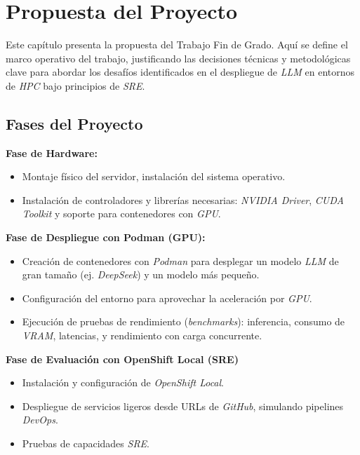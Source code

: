 \chapter{Propuesta del Proyecto}

Este capítulo presenta la propuesta del Trabajo Fin de Grado. Aquí se define el marco operativo del trabajo, justificando las decisiones técnicas y metodológicas clave para abordar los desafíos identificados en el despliegue de \textit{LLM} en entornos de \textit{HPC} bajo principios de \textit{SRE}.

\section{Fases del Proyecto}
\noindent\textbf{Fase de Hardware:}
\begin{itemize}
    \item Montaje físico del servidor, instalación del sistema operativo.
    \item Instalación de controladores y librerías necesarias: \textit{NVIDIA Driver}, \textit{CUDA Toolkit} y soporte para contenedores con \textit{GPU}.
\end{itemize}
\textbf{Fase de Despliegue con Podman (GPU):}
\begin{itemize}
    \item Creación de contenedores con \textit{Podman} para desplegar un modelo \textit{LLM} de gran tamaño (ej. \textit{DeepSeek}) y un modelo más pequeño.
    \item Configuración del entorno para aprovechar la aceleración por \textit{GPU}.
    \item Ejecución de pruebas de rendimiento (\textit{benchmarks}): inferencia, consumo de \textit{VRAM}, latencias, y rendimiento con carga concurrente.
\end{itemize}
\noindent\textbf{Fase de Evaluación con OpenShift Local (SRE)}
\begin{itemize}
    \item Instalación y configuración de \textit{OpenShift Local}.
    \item Despliegue de servicios ligeros desde URLs de \textit{GitHub}, simulando pipelines \textit{DevOps}.
    \item Pruebas de capacidades \textit{SRE}.
\end{itemize}

